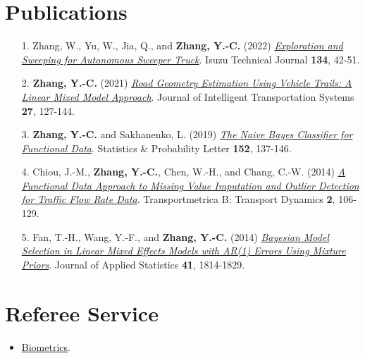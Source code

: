 \documentclass[a4paper,10pt,dvipdfmx]{article}
\begin{document}
\section*{Publications}
\begin{itemize}[noitemsep,nolistsep]
  \item[1.] Zhang, W., Yu, W., Jia, Q., and \textbf{Zhang, Y.-C.} (2022) \href{https://chris7462.github.io/Sweeping.pdf}{\textit{Exploration and Sweeping for Autonomous Sweeper Truck}}. Isuzu Technical Journal \textbf{134}, 42-51.
  \item[2.] \textbf{Zhang, Y.-C.} (2021) \href{https://www.tandfonline.com/doi/full/10.1080/15472450.2021.1974858}{\textit{Road Geometry Estimation Using Vehicle Trails: A Linear Mixed Model Approach}}. Journal of Intelligent Transportation Systems \textbf{27}, 127-144.
  \item[3.] \textbf{Zhang, Y.-C.} and Sakhanenko, L. (2019) \href{https://www.sciencedirect.com/science/article/pii/S0167715219301208}{\textit{The Naive Bayes Classifier for Functional Data}}. Statistics \& Probability Letter \textbf{152}, 137-146.
  \item[4.] Chiou, J.-M., \textbf{Zhang, Y.-C.}, Chen, W.-H., and Chang, C.-W. (2014) \href{http://www.tandfonline.com/doi/abs/10.1080/21680566.2014.892847}{\textit{A Functional Data Approach to Missing Value Imputation and Outlier Detection for Traffic Flow Rate Data}}. Transportmetrica B: Transport Dynamics \textbf{2}, 106-129.
  \item[5.] Fan, T.-H., Wang, Y.-F., and \textbf{Zhang, Y.-C.} (2014) \href{http://www.tandfonline.com/doi/abs/10.1080/02664763.2014.894001?journalCode=cjas20}{\textit{Bayesian Model Selection in Linear Mixed Effects Models with AR(1) Errors Using Mixture Priors}}. Journal of Applied Statistics \textbf{41}, 1814-1829.
\end{itemize}

\section*{Referee Service}
\begin{itemize}[noitemsep,nolistsep]
  \item \href{https://chris7462.github.io/BIOM_Reviewer_Certificate.pdf}{Biometrics}.
\end{itemize}
\end{document}

